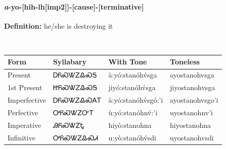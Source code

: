 \paragraph*{\textit{a}{-}\textbf{yo}{-}[hih-lh[imp2]]{-}[cause]{-}[terminative]}
\nopagebreak
\textbf{Definition: } he/she is destroying it
\\[0.5em]
\begin{tabularx}{\textwidth}{l X X X}%
\toprule%
\textbf{Form}&\textbf{Syllabary}&\textbf{With Tone}&\textbf{Toneless}\\%
\midrule%
Present&ᎠᏲᏍᏔᏃᎲᏍᎦ&à:yó:stanóhv́sga&ayostanohvsga\\%
1st Present&ᏥᏲᏍᏔᏃᎲᏍᎦ&jiyó:stanóhv́sga&jiyostanohvsga\\%
Imperfective&ᎠᏲᏍᏔᏃᎲᏍᎪᎢ&à:yó:stanóhv́sgó:’i&ayostanohvsgo’i\\%
Perfective&ᎤᏲᏍᏔᏃᏅᎢ&ù:yó:stanóhnv́:’i&uyostanohnv’i\\%
Imperative&ᎯᏲᏍᏔᏃᎿ&hiyò:stanohna&hiyostanohna\\%
Infinitive&ᎤᏲᏍᏔᏃᎲᏍᏗ&u:yò:stanóhv́sdi&uyostanohvsdi\\%
\bottomrule%
\end{tabularx}
\\[1em]